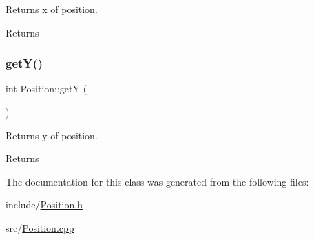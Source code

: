 Returns x of position. 

\begin{DoxyReturn}{Returns}

\end{DoxyReturn}
\mbox{\label{classPosition_ab386f9a955ea2e291774f8d403614260}} 
\subsubsection{\texorpdfstring{get\+Y()}{getY()}}
{\footnotesize\ttfamily int Position\+::getY (\begin{DoxyParamCaption}{ }\end{DoxyParamCaption})}



Returns y of position. 

\begin{DoxyReturn}{Returns}

\end{DoxyReturn}


The documentation for this class was generated from the following files\+:\begin{DoxyCompactItemize}
\item 
include/\hyperlink{Position_8h}{Position.\+h}\item 
src/\hyperlink{Position_8cpp}{Position.\+cpp}\end{DoxyCompactItemize}
